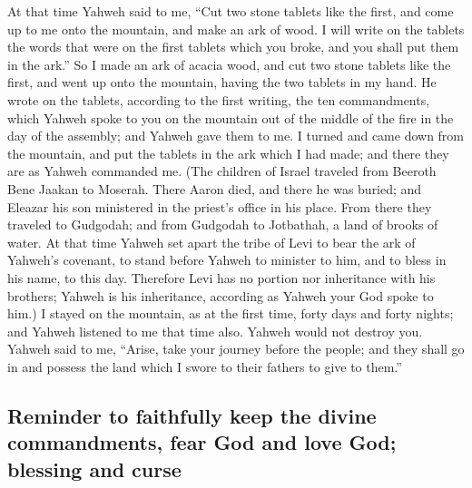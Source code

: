  At that time Yahweh said to me, ``Cut two stone tablets
like the first, and come up to me onto the mountain, and make an ark of
wood.  I will write on the tablets the words that were on
the first tablets which you broke, and you shall put them in the ark.''
 So I made an ark of acacia wood, and cut two stone
tablets like the first, and went up onto the mountain, having the two
tablets in my hand.  He wrote on the tablets, according to
the first writing, the ten commandments, which Yahweh spoke to you on
the mountain out of the middle of the fire in the day of the assembly;
and Yahweh gave them to me.  I turned and came down from
the mountain, and put the tablets in the ark which I had made; and there
they are as Yahweh commanded me.  (The children of Israel
traveled from Beeroth Bene Jaakan to Moserah. There Aaron died, and
there he was buried; and Eleazar his son ministered in the priest's
office in his place.  From there they traveled to
Gudgodah; and from Gudgodah to Jotbathah, a land of brooks of water.
 At that time Yahweh set apart the tribe of Levi to bear
the ark of Yahweh's covenant, to stand before Yahweh to minister to him,
and to bless in his name, to this day.  Therefore Levi has
no portion nor inheritance with his brothers; Yahweh is his inheritance,
according as Yahweh your God spoke to him.)  I stayed on
the mountain, as at the first time, forty days and forty nights; and
Yahweh listened to me that time also. Yahweh would not destroy you.
 Yahweh said to me, ``Arise, take your journey before the
people; and they shall go in and possess the land which I swore to their
fathers to give to them.''

\hypertarget{reminder-to-faithfully-keep-the-divine-commandments-fear-god-and-love-god-blessing-and-curse}{%
\subsection{Reminder to faithfully keep the divine commandments, fear
God and love God; blessing and
curse}\label{reminder-to-faithfully-keep-the-divine-commandments-fear-god-and-love-god-blessing-and-curse}}

